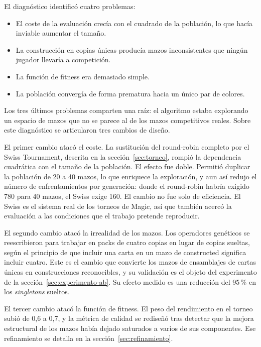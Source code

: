 El diagnóstico identificó cuatro problemas:

\begin{itemize}
    \item El coste de la evaluación crecía con el cuadrado de la población, lo que hacía inviable aumentar el tamaño.
    \item La construcción en copias únicas producía mazos inconsistentes que ningún jugador llevaría a competición.
    \item La función de fitness era demasiado simple.
    \item La población convergía de forma prematura hacia un único par de colores.
\end{itemize}

Los tres últimos problemas comparten una raíz: el algoritmo estaba explorando un espacio de mazos que no se parece al de los mazos competitivos reales. Sobre este diagnóstico se articularon tres cambios de diseño.

El primer cambio atacó el coste. La sustitución del round-robin completo por el Swiss Tournament, descrita en la sección~\ref{sec:torneo}, rompió la dependencia cuadrática con el tamaño de la población. El efecto fue doble. Permitió duplicar la población de 20 a 40 mazos, lo que enriquece la exploración, y aun así redujo el número de enfrentamientos por generación: donde el round-robin habría exigido 780 para 40 mazos, el Swiss exige 160. El cambio no fue solo de eficiencia. El Swiss es el sistema real de los torneos de Magic, así que también acercó la evaluación a las condiciones que el trabajo pretende reproducir.

El segundo cambio atacó la irrealidad de los mazos. Los operadores genéticos se reescribieron para trabajar en packs de cuatro copias en lugar de copias sueltas, según el principio de que incluir una carta en un mazo de constructed significa incluir cuatro. Este es el cambio que convierte los mazos de ensamblajes de cartas únicas en construcciones reconocibles, y su validación es el objeto del experimento de la sección~\ref{sec:experimento-ab}. Su efecto medido es una reducción del 95\,\% en los \emph{singletons} sueltos.

El tercer cambio atacó la función de fitness. El peso del rendimiento en el torneo subió de 0,6 a 0,7, y la métrica de calidad se rediseñó tras detectar que la mejora estructural de los mazos había dejado saturados a varios de sus componentes. Ese refinamiento se detalla en la sección~\ref{sec:refinamiento}.

